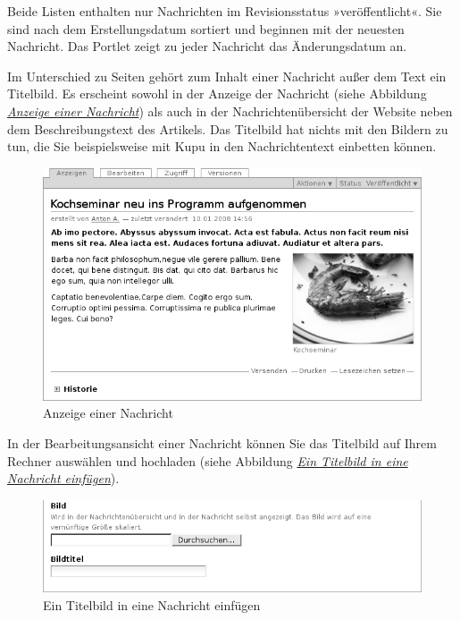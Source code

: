 \documentclass[a4paper,12pt,ngerman]{manual}
\begin{document}
Beide Listen enthalten nur Nachrichten im Revisionsstatus »veröffentlicht«.
Sie sind nach dem Erstellungsdatum sortiert und beginnen mit der neuesten
Nachricht. Das Portlet zeigt zu jeder Nachricht das Änderungsdatum an.

Im Unterschied zu Seiten gehört zum Inhalt einer Nachricht außer dem
Text ein Titelbild. Es erscheint sowohl in der Anzeige der Nachricht
(siehe Abbildung \hyperlink{fig-nachricht}{\emph{Anzeige einer Nachricht}}) als auch in der
Nachrichtenübersicht der Website neben dem Beschreibungstext des
Artikels. Das Titelbild hat nichts mit den Bildern zu tun, die Sie
beispielsweise mit Kupu in den Nachrichtentext einbetten können.
\hypertarget{fig-nachricht}{}\begin{figure}[htbp]
\centering

\includegraphics{nachricht.png}
\caption{Anzeige einer Nachricht}\end{figure}

In der Bearbeitungsansicht einer Nachricht können Sie das Titelbild auf Ihrem
Rechner auswählen und hochladen (siehe
Abbildung \hyperlink{fig-nachricht-bild-einfuegen}{\emph{Ein Titelbild in eine Nachricht einfügen}}).
\hypertarget{fig-nachricht-bild-einfuegen}{}\begin{figure}[htbp]
\centering

\includegraphics{nachricht-bild-einfuegen.png}
\caption{Ein Titelbild in eine Nachricht einfügen}\end{figure}
\end{document}
